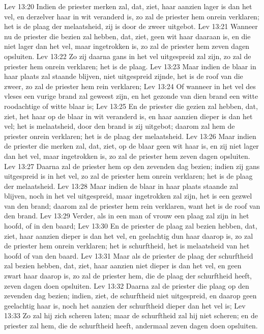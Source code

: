 Lev 13:20  Indien de priester merken zal, dat, ziet, haar aanzien lager is dan het vel, en derzelver haar in wit veranderd is, zo zal de priester hem onrein verklaren; het is de plaag der melaatsheid, zij is door de zweer uitgebot.
Lev 13:21  Wanneer nu de priester die bezien zal hebben, dat, ziet, geen wit haar daaraan is, en die niet lager dan het vel, maar ingetrokken is, zo zal de priester hem zeven dagen opsluiten.
Lev 13:22  Zo zij daarna gans in het vel uitgespreid zal zijn, zo zal de priester hem onrein verklaren; het is de plaag.
Lev 13:23  Maar indien de blaar in haar plaats zal staande blijven, niet uitgespreid zijnde, het is de roof van die zweer, zo zal de priester hem rein verklaren;
Lev 13:24  Of wanneer in het vel des vleses een vurige brand zal geweest zijn, en het gezonde van dien brand een witte roodachtige of witte blaar is;
Lev 13:25  En de priester die gezien zal hebben, dat, ziet, het haar op de blaar in wit veranderd is, en haar aanzien dieper is dan het vel; het is melaatsheid, door den brand is zij uitgebot; daarom zal hem de priester onrein verklaren; het is de plaag der melaatsheid.
Lev 13:26  Maar indien de priester die merken zal, dat, ziet, op de blaar geen wit haar is, en zij niet lager dan het vel, maar ingetrokken is, zo zal de priester hem zeven dagen opsluiten.
Lev 13:27  Daarna zal de priester hem op den zevenden dag bezien; indien zij gans uitgespreid is in het vel, zo zal de priester hem onrein verklaren; het is de plaag der melaatsheid.
Lev 13:28  Maar indien de blaar in haar plaats staande zal blijven, noch in het vel uitgespreid, maar ingetrokken zal zijn, het is een gezwel van den brand; daarom zal de priester hem rein verklaren, want het is de roof van den brand.
Lev 13:29  Verder, als in een man of vrouw een plaag zal zijn in het hoofd, of in den baard;
Lev 13:30  En de priester de plaag zal bezien hebben, dat, ziet, haar aanzien dieper is dan het vel, en geelachtig dun haar daarop is, zo zal de priester hem onrein verklaren; het is schurftheid, het is melaatsheid van het hoofd of van den baard.
Lev 13:31  Maar als de priester de plaag der schurftheid zal bezien hebben, dat, ziet, haar aanzien niet dieper is dan het vel, en geen zwart haar daarop is, zo zal de priester hem, die de plaag der schurftheid heeft, zeven dagen doen opsluiten.
Lev 13:32  Daarna zal de priester die plaag op den zevenden dag bezien; indien, ziet, de schurftheid niet uitgespreid, en daarop geen geelachtig haar is, noch het aanzien der schurftheid dieper dan het vel is;
Lev 13:33  Zo zal hij zich scheren laten; maar de schurftheid zal hij niet scheren; en de priester zal hem, die de schurftheid heeft, andermaal zeven dagen doen opsluiten.
